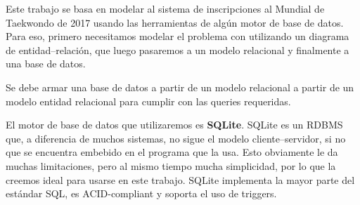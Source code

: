 Este trabajo se basa en modelar al sistema de inscripciones al Mundial de Taekwondo de 2017 usando las herramientas de algún motor de base de datos.
Para eso, primero necesitamos modelar el problema con utilizando un diagrama de entidad--relación, que luego pasaremos a un modelo relacional y finalmente a una base de datos.

Se debe armar una base de datos a partir de un modelo relacional a partir de un modelo entidad relacional para cumplir con las queries requeridas.

El motor de base de datos que utilizaremos es \textbf{SQLite}. SQLite es un RDBMS que, a diferencia de muchos sistemas, no sigue el modelo cliente--servidor, si no que se encuentra embebido en el programa que la usa. Esto obviamente le da muchas limitaciones, pero al mismo tiempo mucha simplicidad, por lo que la creemos ideal para usarse en este trabajo.
SQLite implementa la mayor parte del estándar SQL, es ACID-compliant y soporta el uso de triggers.

